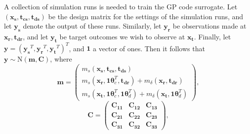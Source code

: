 \documentclass[twocolumn,10pt]{asme2ej}
\begin{document}
%
A collection of simulation runs is needed to train the GP code surrogate.
%
Let $(\mathbf{x_s},\mathbf{t_{cs}},\mathbf{t_{ds}})$ be the design matrix for the settings of the simulation runs, and let $\mathbf{y_s}$ denote the output of these runs.
%
Similarly, let $\mathbf{y_r}$ be observations made at $\mathbf{x_r},\mathbf{t_{dr}}$, and let $\mathbf {y_t}$ be target outcomes we wish to observe at $\mathbf {x_t}$.
%
Finally, let $\mathbf y = (\mathbf{y_s}^T,\mathbf{y_r}^T,\mathbf{y_t}^T)^T$, and $\mathbf 1$ a vector of ones.
%
Then it follows that $\mathbf y\sim \mathrm{N}(\mathbf m,\mathbf C)$, where
\[
\mathbf m = \begin{pmatrix}
m_s(\mathbf{x_s},\mathbf{t_{cs}},\mathbf{t_{ds}})\\
m_s(\mathbf{x_r},\mathbf1\boldsymbol\theta_c^T,\mathbf{t_{dr}}) + m_\delta(\mathbf{x_r},\mathbf{t_{dr}})\\
m_s(\mathbf{x_t},\mathbf1\boldsymbol\theta_c^T,\mathbf1\boldsymbol\theta_d^T) + m_\delta(\mathbf{x_t},\mathbf1\boldsymbol\theta_d^T)
\end{pmatrix},
\]
\[
\mathbf C = \begin{pmatrix}
\mathbf{C_{11}} & \mathbf{C_{12}} & \mathbf{C_{13}}\\
\mathbf{C_{21}} & \mathbf{C_{22}} & \mathbf{C_{23}}\\
\mathbf{C_{31}} & \mathbf{C_{32}} & \mathbf{C_{33}}
\end{pmatrix},
\]
\end{document}
